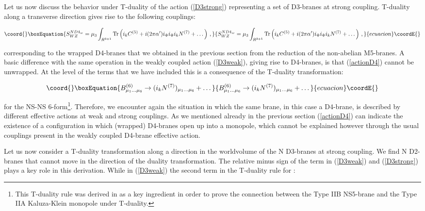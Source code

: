\documentclass[12pt,a4paper]{article}
\begin{document}
Let us now discuss the behavior under T-duality
of the action (\ref{D3strong}) representing
a set of D3-branes at strong coupling.
T-duality along a transverse direction
gives rise to the following couplings:

\begin{equation}\coord{}\boxEquation{
\label{actionD4}
S^{ND4_w}_{WZ}=\mu_3\int_{R^{3+1}}{\rm Tr}\left(i_k C^{(5)}+
i(2\pi\alpha^\prime)i_\Phi i_\Phi i_k N^{(7)}+\dots\right)\, ,
}{
S^{ND4_w}_{WZ}=\mu_3\int_{R^{3+1}}{\rm Tr}\left(i_k C^{(5)}+
i(2\pi\alpha^\prime)i_\Phi i_\Phi i_k N^{(7)}+\dots\right)\, ,
}{ecuacion}\coordE{}\end{equation}

\noindent corresponding to the wrapped D4-branes that we obtained
in the previous section from the reduction of the non-abelian
M5-branes.
A basic difference with the same operation in
the weakly coupled action (\ref{D3weak}), giving rise to D4-branes,
is that (\ref{actionD4}) cannot be unwrapped. At the level of the
terms that we have included this is a consequence of the T-duality
transformation:

\begin{equation}\coord{}\boxEquation{
\label{BN}
B^{(6)}_{\mu_1\dots\mu_6}\rightarrow (i_k N^{(7)})_{\mu_1\dots\mu_6}
+\dots
}{
B^{(6)}_{\mu_1\dots\mu_6}\rightarrow (i_k N^{(7)})_{\mu_1\dots\mu_6}
+\dots
}{ecuacion}\coordE{}\end{equation}

\noindent for the NS-NS 6-form\footnote{This T-duality rule was derived
in \cite{EJL} as a key ingredient in order to prove the connection
between the Type IIB NS5-brane and the Type IIA Kaluza-Klein 
monopole under T-duality.}.
Therefore, we encounter again the situation in which the
same brane, in this case a D4-brane, is described by different
effective actions at weak and strong couplings.
As we mentioned already in the previous section  
(\ref{actionD4}) can indicate the existence of
a configuration in which (wrapped) D4-branes open up into a 
monopole, which cannot be explained however through the usual
couplings present in the weakly coupled D4-brane effective action.

Let us now consider a T-duality transformation
along a direction in the worldvolume of the N D3-branes at
strong coupling. We find N D2-branes that cannot move in the
direction of the duality transformation.
The relative minus sign of the \coordHE{} term
in (\ref{D3weak}) and (\ref{D3strong}) plays a key role in this
derivation. While in (\ref{D3weak})
the second term in the T-duality rule for \coordHE{}:
\end{document}

